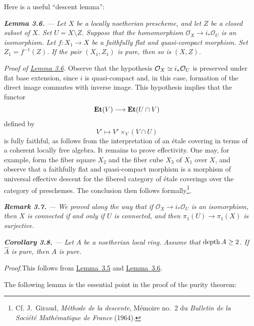 \medskip
\noindent Here is a useful ``descent lemma'':

\medskip
{\itshape
{}\noindent\textbf{Lemma 3.6.} --- Let $X$ be a locally noetherian prescheme,
and let $Z$ be a closed subset of $X$. Set $U=X\setminus Z$. Suppose that
the homomorphism $\mathcal O_X\to i_*\mathcal O_U$ is an isomorphism. Let
$f\colon X_1\to X$ be a faithfully flat and quasi-compact morphism. Set
$Z_1=f^{-1}(Z)$. If the pair $(X_1,Z_1)$ is pure, then so is $(X,Z)$.
}

\medskip
\noindent\textit{Proof of \hyperref[X.3.6]{Lemma 3.6}.}\quad
Observe that the hypothesis
$\mathcal O_X\simeq i_*\mathcal O_U$ is preserved under flat base extension, since $i$ is
quasi-compact and, in this case, formation of the direct image commutes with
inverse image. This hypothesis implies that the functor
\[
  \mathbf{Et}(V)\longrightarrow\mathbf{Et}(U\cap V)
\]
defined by
\[
  V'\longmapsto V'\times_V(V\cap U)
\]
is fully faithful, as follows from the interpretation of an étale covering
in terms of a coherent locally free algebra. It remains to prove effectivity.
One may, for example, form the fiber square $X_2$ and the fiber cube $X_3$ of
$X_1$ over $X$, and observe that a faithfully flat and quasi-compact
morphism is a morphism of universal effective descent for the fibered
category of étale coverings over the category of preschemes. The conclusion
then follows formally\renewcommand{\thefootnote}{(*)}\footnote{Cf. J.~Giraud,
\emph{Méthode de la descente}, Mémoire no.~2 du \emph{Bulletin de la Société
Mathématique de France} (1964).}.

\medskip
{\itshape
{}\noindent\textbf{Remark 3.7.} --- We proved along the way that if
$\mathcal O_X\to i_*\mathcal O_U$ is an isomorphism, then $X$ is connected if
and only if $U$ is connected, and then $\pi_1(U)\to\pi_1(X)$ is surjective.
}

\medskip
{\itshape
{}\noindent\textbf{Corollary 3.8.} --- Let $A$ be a noetherian local ring.
Assume that $\operatorname{depth} A\geq 2$. If $\widehat{A}$ is pure, then $A$ is pure.
}

\medskip
\noindent\emph{Proof.}\quad This follows from \hyperref[X.3.5]{Lemma~3.5} and \hyperref[X.3.6]{Lemma~3.6}.

\medskip
\noindent The following lemma is the essential point in the proof of the purity theorem:

